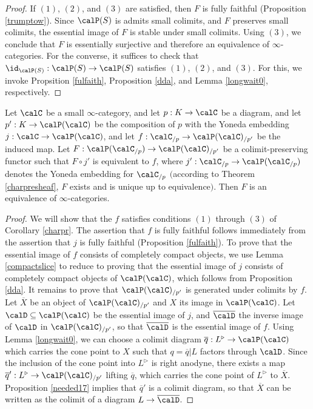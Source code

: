 \begin{proof}
If $(1)$, $(2)$, and $(3)$ are satisfied, then $F$ is fully faithful (Proposition \ref{trumptow}). 
Since $\calP(S)$ is admits small colimits, and $F$ preserves small colimits, the essential image of $F$ is stable under small colimits. Using $(3)$, we conclude that $F$ is essentially surjective and therefore an equivalence of $\infty$-categories. For the converse, it suffices to check that
$\id_{\calP(S)}: \calP(S) \rightarrow \calP(S)$ satisfies $(1)$, $(2)$, and $(3)$. For this, we invoke Propsition \ref{fulfaith}, Proposition \ref{dda}, and Lemma \ref{longwait0}, respectively.
\end{proof}

\begin{corollary}\label{swapKK}
Let $\calC$ be a small $\infty$-category, and let $p: K \rightarrow \calC$ be a diagram, and
let $p': K \rightarrow \calP(\calC)$ be the composition of $p$ with the Yoneda embedding
$j: \calC \rightarrow \calP(\calC)$, and let $f: \calC_{/p} \rightarrow \calP(\calC)_{/p'}$ be the induced map. Let $F: \calP(\calC_{/p}) \rightarrow \calP(\calC)_{/p'}$ be a colimit-preserving functor such that $F \circ j'$ is equivalent to $f$, where $j': \calC_{/p} \rightarrow \calP(\calC_{/p})$ denotes the Yoneda embedding for $\calC_{/p}$ $($according to Theorem \ref{charpresheaf}, $F$ exists and is unique up to equivalence$)$. Then $F$ is an equivalence of $\infty$-categories.
\end{corollary}

\begin{proof}
We will show that the $f$ satisfies conditions $(1)$ through $(3)$ of Corollary \ref{charpr}.
The assertion that $f$ is fully faithful follows immediately from the assertion that $j$ is fully faithful (Proposition \ref{fulfaith}). To prove that the essential image of $f$ consists of completely compact objects, we use Lemma \ref{compactslice} to reduce to proving that the essential image of $j$ consists of completely compact objects of $\calP(\calC)$, which follows from Proposition \ref{dda}.
It remains to prove that $\calP(\calC)_{/p'}$ is generated under colimits by $f$. Let
$\overline{X}$ be an object of $\calP(\calC)_{/p'}$ and $X$ its image in $\calP(\calC)$. 
Let $\calD \subseteq \calP(\calC)$ be the essential image of $j$, and $\overline{\calD}$ the inverse image of $\calD$ in $\calP(\calC)_{/p'}$, so that $\overline{\calD}$ is the essential image of $f$.
Using Lemma \ref{longwait0}, we can choose a colimit diagram $\overline{q}: L^{\triangleright} \rightarrow \calP(\calC)$ which carries the cone point to $X$ such that $q = \overline{q}|L$ factors through $\calD$. Since the inclusion of the cone point into $L^{\triangleright}$ is right anodyne,
there exists a map $\overline{q}': L^{\triangleright} \rightarrow \calP(\calC)_{/p'}$ lifting
$\overline{q}$, which carries the cone point of $L^{\triangleright}$ to $\overline{X}$. 
Proposition \ref{needed17} implies that $\overline{q}'$ is a colimit diagram, so that 
$\overline{X}$ can be written as the colimit of a diagram $L \rightarrow \overline{\calD}$.
\end{proof}
